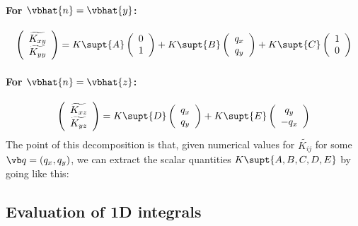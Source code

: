 \documentclass[letterpaper]{article}
\renewcommand{\wt}{\widetilde}
\begin{document}
\paragraph{For $\vbhat{n}=\vbhat{y}$:}

$$ \left(\begin{array}{c} \wt{K_{xy}} \\ \wt{K_{yy}} \end{array}\right)
   = K\supt{A} \left(\begin{array}{c} 0   \\ 1   \end{array}\right)
    +K\supt{B} \left(\begin{array}{c} q_x \\ q_y \end{array}\right)
    +K\supt{C} \left(\begin{array}{c} 1   \\ 0   \end{array}\right)
$$

\paragraph{For $\vbhat{n}=\vbhat{z}$:}
$$ \left(\begin{array}{c} \wt{K_{xz}} \\ \wt{K_{yz}} \end{array}\right)
   = K\supt{D} \left(\begin{array}{c} q_x \\ q_y \end{array}\right)
    +K\supt{E} \left(\begin{array}{c} q_y \\ -q_x \end{array}\right)
$$
The point of this decomposition is that, given numerical values
for $\wt{K_{ij}}$ for some $\vb q=(q_x, q_y)$, we can extract the
scalar quantities $K\supt{A,B,C,D,E}$ by going like this:

\newpage
\subsection{Evaluation of 1D integrals}
\label{OneDIntegralSection}
\end{document}
